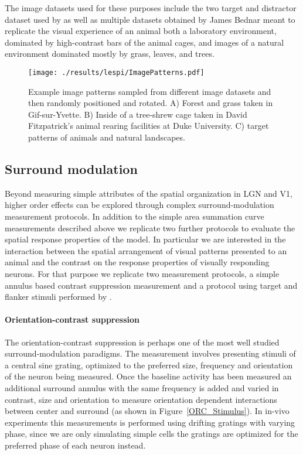 The image datasets used for these purposes include the two target and
distractor dataset used by \cite{Serre2007} as well as multiple
datasets obtained by James Bednar meant to replicate the visual
experience of an animal both a laboratory environment, dominated by
high-contrast bars of the animal cages, and images of a natural
environment dominated mostly by grass, leaves, and trees.

\begin{figure}
	\centering
	\texttt{[image: ./results/lespi/ImagePatterns.pdf]}
	\caption[Example image patterns used to train the model] {Example
      image patterns sampled from different image datasets and then
      randomly positioned and rotated. A) Forest and grass taken in
      Gif-sur-Yvette. B) Inside of a tree-shrew cage taken in David
      Fitzpatrick's animal rearing facilities at Duke University.
      C) \cite{Serre2007} target patterns of animals and natural landscapes.}
    \label{image_patterns}
\end{figure}

\subsection{Surround modulation}

Beyond measuring simple attributes of the spatial organization in LGN
and V1, higher order effects can be explored through complex
surround-modulation measurement protocols. In addition to the simple
area summation curve measurements described above we replicate two
further protocols to evaluate the spatial response properties of the
model.  In particular we are interested in the interaction between the
spatial arrangement of visual patterns presented to an animal and the
contrast on the response properties of visually responding
neurons. For that purpose we replicate two measurement protocols, a
simple annulus based contrast suppression measurement \cite{Jones2002}
and a protocol using target and flanker stimuli performed by
\cite{Kapadia1995}.

\paragraph{Orientation-contrast suppression}

The orientation-contrast suppression is perhaps one of the most well
studied surround-modulation paradigms. The measurement involves
presenting stimuli of a central sine grating, optimized to the
preferred size, frequency and orientation of the neuron being
measured. Once the baseline activity has been measured an additional
surround annulus with the same frequency is added and varied in
contrast, size and orientation to measure orientation dependent
interactions between center and surround (as shown in
Figure~\ref{ORC_Stimulus}). In in-vivo experiments this measurements
is performed using drifting gratings with varying phase, since we are
only simulating simple cells the gratings are optimized for the
preferred phase of each neuron instead.

